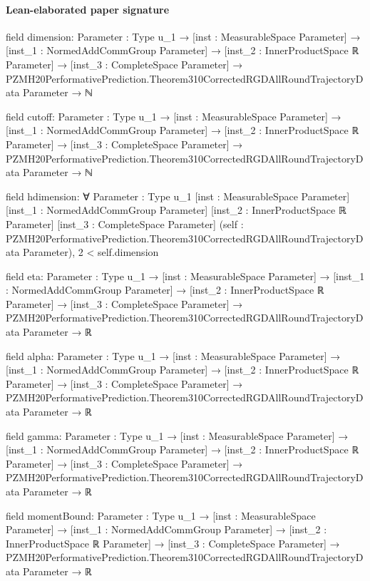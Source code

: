 \documentclass[10pt]{article}
\begin{document}
\paragraph{Lean-elaborated paper signature}
\begin{ReviewVerbatim}
field dimension:
{Parameter : Type u_1} →
  [inst : MeasurableSpace Parameter] →
    [inst_1 : NormedAddCommGroup Parameter] →
      [inst_2 : InnerProductSpace ℝ Parameter] →
        [inst_3 : CompleteSpace Parameter] →
          PZMH20PerformativePrediction.Theorem310CorrectedRGDAllRoundTrajectoryData Parameter → ℕ

field cutoff:
{Parameter : Type u_1} →
  [inst : MeasurableSpace Parameter] →
    [inst_1 : NormedAddCommGroup Parameter] →
      [inst_2 : InnerProductSpace ℝ Parameter] →
        [inst_3 : CompleteSpace Parameter] →
          PZMH20PerformativePrediction.Theorem310CorrectedRGDAllRoundTrajectoryData Parameter → ℕ

field hdimension:
∀ {Parameter : Type u_1} [inst : MeasurableSpace Parameter] [inst_1 : NormedAddCommGroup Parameter]
  [inst_2 : InnerProductSpace ℝ Parameter] [inst_3 : CompleteSpace Parameter]
  (self : PZMH20PerformativePrediction.Theorem310CorrectedRGDAllRoundTrajectoryData Parameter), 2 < self.dimension

field eta:
{Parameter : Type u_1} →
  [inst : MeasurableSpace Parameter] →
    [inst_1 : NormedAddCommGroup Parameter] →
      [inst_2 : InnerProductSpace ℝ Parameter] →
        [inst_3 : CompleteSpace Parameter] →
          PZMH20PerformativePrediction.Theorem310CorrectedRGDAllRoundTrajectoryData Parameter → ℝ

field alpha:
{Parameter : Type u_1} →
  [inst : MeasurableSpace Parameter] →
    [inst_1 : NormedAddCommGroup Parameter] →
      [inst_2 : InnerProductSpace ℝ Parameter] →
        [inst_3 : CompleteSpace Parameter] →
          PZMH20PerformativePrediction.Theorem310CorrectedRGDAllRoundTrajectoryData Parameter → ℝ

field gamma:
{Parameter : Type u_1} →
  [inst : MeasurableSpace Parameter] →
    [inst_1 : NormedAddCommGroup Parameter] →
      [inst_2 : InnerProductSpace ℝ Parameter] →
        [inst_3 : CompleteSpace Parameter] →
          PZMH20PerformativePrediction.Theorem310CorrectedRGDAllRoundTrajectoryData Parameter → ℝ

field momentBound:
{Parameter : Type u_1} →
  [inst : MeasurableSpace Parameter] →
    [inst_1 : NormedAddCommGroup Parameter] →
      [inst_2 : InnerProductSpace ℝ Parameter] →
        [inst_3 : CompleteSpace Parameter] →
          PZMH20PerformativePrediction.Theorem310CorrectedRGDAllRoundTrajectoryData Parameter → ℝ


\end{ReviewVerbatim}
\end{document}
